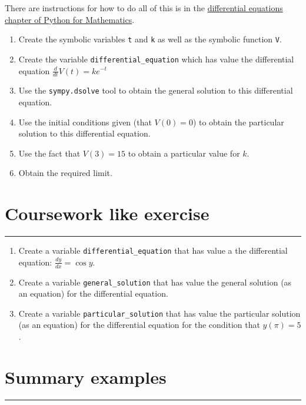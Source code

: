 \documentclass{article}
\begin{document}
There are instructions for how to do all of this is in the
\href{https://vknight.org/pfm/tools-for-mathematics/09-differential-equations/how/main.html}{differential equations chapter of Python for Mathematics}.


\begin{enumerate}
    \item Create the symbolic variables \texttt{t} and
        \texttt{k} as well as the symbolic function
        \texttt{V}.
    \item Create the variable \texttt{differential_equation} which
    has value the differential equation $\frac{d}{dt}V(t)=ke^{-t}$    
    \item Use the \texttt{sympy.dsolve} tool to obtain the general
        solution to this differential equation.
    \item Use the initial conditions given (that $V(0)=0$) to obtain the
        particular solution to this differential equation.
    \item Use the fact that $V(3)=15$ to obtain a particular value for $k$.
    \item Obtain the required limit.
\end{enumerate}


\section{Coursework like exercise}
\hrule


\begin{enumerate}
    \item Create a variable \texttt{differential_equation} that has value a
        the differential equation: $\frac{dy}{dx}=\cos{y}$.
    \item Create a variable \texttt{general_solution} that has
        value the general solution (as an equation) for the differential equation.
    \item Create a variable \texttt{particular_solution} that has
        value the particular solution (as an equation) for the differential
        equation for the condition that $y(\pi)=5$.
\end{enumerate}

\section{Summary examples}
\hrule
\end{document}
